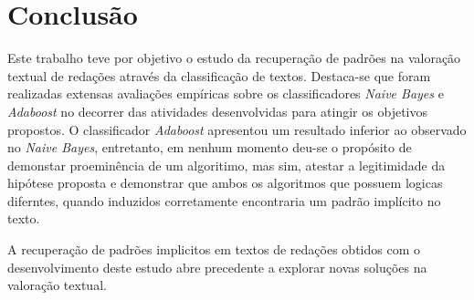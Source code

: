 \section{Conclusão}

Este trabalho teve por objetivo o estudo da recuperação de padrões na valoração 
textual de redações através da classificação de textos. Destaca-se que foram 
realizadas extensas avaliações empíricas sobre os classificadores 
\textit{Naive Bayes} e \textit{Adaboost} no decorrer das atividades 
desenvolvidas para atingir os objetivos propostos. O classificador 
\textit{Adaboost} apresentou um resultado inferior ao observado no 
\textit{Naive Bayes}, entretanto, em nenhum momento deu-se o propósito de 
demonstar proeminência de um algoritimo, mas sim, atestar a legitimidade da 
hipótese proposta e demonstrar que ambos os algoritmos que possuem 
logicas diferntes, quando induzidos corretamente encontraria um padrão 
implícito no texto. 

A recuperação de padrões implicitos em textos de redações obtidos com o 
desenvolvimento deste estudo abre precedente a explorar novas soluções na
valoração textual.